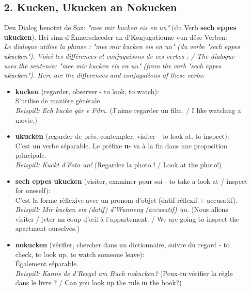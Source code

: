 \subsection*{2. Kucken, Ukucken an Nokucken}

Den Dialog benotzt de Saz: \textit{"mee mir kucken eis en un"} (du Verb \textbf{sech eppes ukucken}). Hei sinn d'Ënnerscheeder an d'Konjugatioune vun dëse Verben: \\
\textit{Le dialogue utilise la phrase : "mee mir kucken eis en un" (du verbe "sech eppes ukucken"). Voici les différences et conjugaisons de ces verbes : / The dialogue uses the sentence: "mee mir kucken eis en un" (from the verb "sech eppes ukucken"). Here are the differences and conjugations of these verbs:}

\begin{itemize}
    \item \textbf{kucken} (regarder, observer - to look, to watch): \\
    S'utilise de manière générale. \\
    \textit{Beispill:} \textit{Ech kucke gär e Film.} (J'aime regarder un film. / I like watching a movie.)
    
    \item \textbf{ukucken} (regarder de près, contempler, visiter - to look at, to inspect): \\
    C'est un verbe séparable. Le préfixe \textbf{u-} va à la fin dans une proposition principale. \\
    \textit{Beispill:} \textit{Kuckt d'Foto un!} (Regardez la photo ! / Look at the photo!)
    
    \item \textbf{sech eppes ukucken} (visiter, examiner pour soi - to take a look at / inspect for oneself): \\
    C'est la forme réflexive avec un pronom d'objet (datif réflexif + accusatif). \\
    \textit{Beispill:} \textit{Mir kucken eis (datif) d'Wunneng (accusatif) un.} (Nous allons visiter / jeter un coup d'œil à l'appartement. / We are going to inspect the apartment ourselves.)
    
    \item \textbf{nokucken} (vérifier, chercher dans un dictionnaire, suivre du regard - to check, to look up, to watch someone leave): \\
    Également séparable. \\
    \textit{Beispill:} \textit{Kanns de d'Reegel am Buch nokucken?} (Peux-tu vérifier la règle dans le livre ? / Can you look up the rule in the book?)
\end{itemize}

